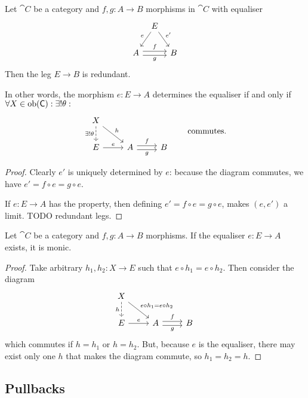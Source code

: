 \begin{lemma}
Let $\cat{C}$ be a category and $f,g: A\to B$ morphisms in $\cat{C}$ with equaliser
\[ \begin{tikzcd}[column sep=tiny]
& E \ar[dl, swap, "e"] \ar[dr, "{e'}"] & \\
A \ar[rr, shift left, "f"] \ar[rr, shift right, swap, "g"] && B
\end{tikzcd} \]
Then the leg $E\to B$ is redundant.
\end{lemma}
In other words, the morphism $e: E\to A$ determines the equaliser \textup{if and only if} $\forall X\in\operatorname{ob}(\mathsf{C}):\exists! \theta :$
\[ \begin{tikzcd}
X \ar[d, dashed, swap, "{\exists! \theta}"] \ar[dr, "h"] && \\
E \ar[r, "e"] & A \ar[r, shift left, "f"] \ar[r, shift right, swap, "g"] & B
\end{tikzcd} \qquad \text{commutes.} \]
\begin{proof}
Clearly $e'$ is uniquely determined by $e$: because the diagram commutes, we have $e' = f\circ e = g\circ e$.

If $e: E\to A$ has the property, then defining $e' = f\circ e = g\circ e$, makes $(e,e')$ a limit. TODO redundant legs.
\end{proof}

\begin{lemma}
Let $\cat{C}$ be a category and $f,g: A\to B$ morphisms. If the equaliser $e: E\to A$ exists, it is monic.
\end{lemma}
\begin{proof}
Take arbitrary $h_1, h_2: X\to E$ such that $e\circ h_1 = e\circ h_2$. Then consider the diagram
\[ \begin{tikzcd}
X \ar[d, dashed, swap, "h"] \ar[dr, "{e\circ h_1 = e\circ h_2}"] && \\
E \ar[r, "e"] & A \ar[r, shift left, "f"] \ar[r, shift right, swap, "g"] & B
\end{tikzcd} \]
which commutes if $h = h_1$ or $h = h_2$. But, because $e$ is the equaliser, there may exist only one $h$ that makes the diagram commute, so $h_1 = h_2 = h$.
\end{proof}

\subsection{Pullbacks}
\begin{definition}

\end{definition}

